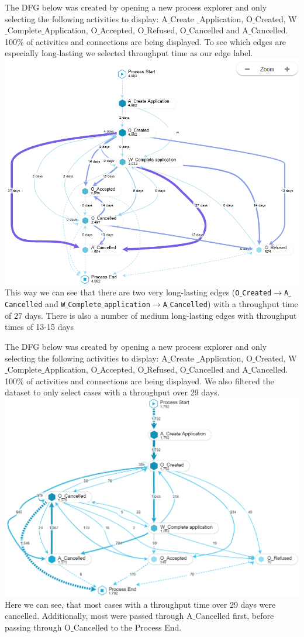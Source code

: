 \documentclass[../../main.tex]{subfiles}
\begin{document}
The DFG below was created by opening a new process explorer and only selecting the following activities to display: A$\_$Create $\_$Application, O$\_$Created, W$\_$Complete$\_$Application, O$\_$Accepted, O$\_$Refused, O$\_$Cancelled and A$\_$Cancelled. 100\% of activities and connections are being displayed. To see which edges are especially long-lasting we selected throughput time as our edge label.\\
\includegraphics[width=\textwidth]{img/QUESTION_5b_DFG.png}
This way we can see that there are two very long-lasting edges (\texttt{O$\_$Created$\rightarrow$A$\_$Cancelled} and \texttt{W$\_$Complete$\_$application$\rightarrow$A$\_$Cancelled}) with a throughput time of 27 days. There is also a number of medium long-lasting edges with throughput times of 13-15 days

The DFG below was created by opening a new process explorer and only selecting the following activities to display: A$\_$Create $\_$Application, O$\_$Created, W$\_$Complete$\_$Application, O$\_$Accepted, O$\_$Refused, O$\_$Cancelled and A$\_$Cancelled. 100\% of activities and connections are being displayed. We also filtered the dataset to only select cases with a throughput over 29 days.
\includegraphics[width=\textwidth]{img/QUESTION_5b_over30.png}
Here we can see, that most cases with a throughput time over 29 days were cancelled. Additionally, most were passed through A$\_$Cancelled first, before passing through O$\_$Cancelled to the Process End.
\end{document}
